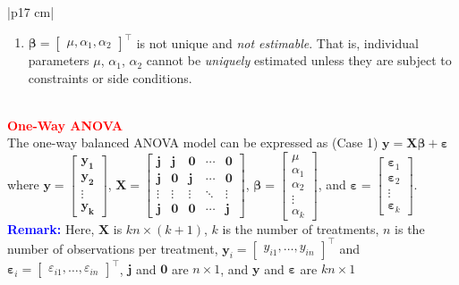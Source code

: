 \documentclass[a4paper,11pt]{article}
\begin{document}
\begin{longtable}{|p{17 cm}|}
\begin{minipage}{\linewidth}
\begin{enumerate}[noitemsep, topsep=0pt]
    \item $\boldsymbol{\beta}=\begin{bmatrix}
        \mu, \alpha_1,\alpha_2
    \end{bmatrix}^\top$ is not unique and \textit{not estimable}. That is, individual parameters $\mu$, $\alpha_1$, $\alpha_2$ cannot be \textit{uniquely} estimated unless they are subject to constraints or side conditions. 
\end{enumerate}
\end{minipage} \\
\hline
\textbf{\textcolor{red}{One-Way ANOVA}}\\
The one-way balanced ANOVA model can be expressed as (Case 1)
$\mathbf{y}=\mathbf{X}\boldsymbol{\beta}+\boldsymbol{\varepsilon}$\\
where $\mathbf{y}=\begin{bmatrix}
    \mathbf{y_1} \\
    \mathbf{y_2} \\
    \vdots \\
    \mathbf{y_k}
\end{bmatrix}$, $\mathbf{X}=\begin{bmatrix}
    \mathbf{j} & \mathbf{j} & \boldsymbol{0} & \cdots & \boldsymbol{0} \\
    \mathbf{j} & \boldsymbol{0} & \mathbf{j} & \cdots & \boldsymbol{0} \\
    \vdots & \vdots & \vdots & \ddots & \vdots \\
    \mathbf{j} & \boldsymbol{0} & \boldsymbol{0} & \cdots & \mathbf{j}
\end{bmatrix}$, $\boldsymbol{\beta}=\begin{bmatrix}
    \mu \\
    \alpha_1 \\
    \alpha_2 \\
    \vdots \\
    \alpha_k
\end{bmatrix}$, and $\boldsymbol{\varepsilon}=\begin{bmatrix}
    \boldsymbol{\varepsilon}_1 \\
    \boldsymbol{\varepsilon}_2 \\
    \vdots \\
    \boldsymbol{\varepsilon}_k
\end{bmatrix}$.\\

\textbf{\textcolor{blue}{Remark:}} Here, $\mathbf{X}$ is $kn\times(k+1)$, $k$ is the number of treatments, $n$ is the number of observations per treatment, $\mathbf{y}_i=\begin{bmatrix}
    y_{i1},\dots,y_{in}
\end{bmatrix}^\top$ and $\boldsymbol{\varepsilon}_i=\begin{bmatrix}
    \varepsilon_{i1},\dots,\varepsilon_{in}
\end{bmatrix}^\top$, $\mathbf{j}$ and $\boldsymbol{0}$ are $n\times1$, and $\mathbf{y}$ and $\boldsymbol{\varepsilon}$ are $kn\times1$\\


\end{longtable}
\end{document}
